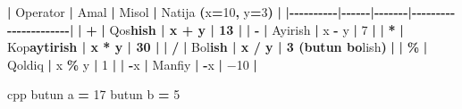 \documentclass[a4paper,11pt,twoside,openright]{book}
\newenvironment{Shaded}{\begin{snugshade}}{\end{snugshade}}
\newcommand{\CharTok}[1]{\textcolor[rgb]{0.31,0.60,0.02}{#1}}
\newcommand{\DecValTok}[1]{\textcolor[rgb]{0.00,0.00,0.81}{#1}}
\newcommand{\ErrorTok}[1]{\textcolor[rgb]{0.64,0.00,0.00}{\textbf{#1}}}
\newcommand{\NormalTok}[1]{#1}
\newcommand{\OperatorTok}[1]{\textcolor[rgb]{0.81,0.36,0.00}{\textbf{#1}}}
\begin{document}
\begin{Shaded}
\begin{Highlighting}[]
\OperatorTok{|}\NormalTok{ Operator }\OperatorTok{|}\NormalTok{ Amal }\OperatorTok{|}\NormalTok{ Misol }\OperatorTok{|}\NormalTok{ Natija }\OperatorTok{(}\ErrorTok{\textasciigrave{}}\NormalTok{x}\OperatorTok{=}\DecValTok{10}\OperatorTok{,}\NormalTok{ y}\OperatorTok{=}\DecValTok{3}\ErrorTok{\textasciigrave{}}\OperatorTok{)} \OperatorTok{|}
\OperatorTok{|{-}{-}{-}{-}{-}{-}{-}{-}{-}{-}|{-}{-}{-}{-}{-}{-}|{-}{-}{-}{-}{-}{-}{-}|{-}{-}{-}{-}{-}{-}{-}{-}{-}{-}{-}{-}{-}{-}{-}{-}{-}{-}{-}{-}{-}{-}|}
\OperatorTok{|} \ErrorTok{\textasciigrave{}}\OperatorTok{+}\ErrorTok{\textasciigrave{}} \OperatorTok{|}\NormalTok{ Qo}\CharTok{\textquotesingle{}s}\ErrorTok{hish | \textasciigrave{}x + y\textasciigrave{} | 13 |}
\OperatorTok{|} \ErrorTok{\textasciigrave{}}\OperatorTok{{-}}\ErrorTok{\textasciigrave{}} \OperatorTok{|}\NormalTok{ Ayirish }\OperatorTok{|} \ErrorTok{\textasciigrave{}}\NormalTok{x }\OperatorTok{{-}}\NormalTok{ y}\ErrorTok{\textasciigrave{}} \OperatorTok{|} \DecValTok{7} \OperatorTok{|}
\OperatorTok{|} \ErrorTok{\textasciigrave{}}\OperatorTok{*}\ErrorTok{\textasciigrave{}} \OperatorTok{|}\NormalTok{ Ko}\CharTok{\textquotesingle{}p}\ErrorTok{aytirish | \textasciigrave{}x * y\textasciigrave{} | 30 |}
\OperatorTok{|} \ErrorTok{\textasciigrave{}}\OperatorTok{/}\ErrorTok{\textasciigrave{}} \OperatorTok{|}\NormalTok{ Bo}\CharTok{\textquotesingle{}l}\ErrorTok{ish | \textasciigrave{}x / y\textasciigrave{} | 3 (butun bo}\CharTok{\textquotesingle{}}\NormalTok{lish}\OperatorTok{)} \OperatorTok{|}
\OperatorTok{|} \ErrorTok{\textasciigrave{}}\OperatorTok{\%}\ErrorTok{\textasciigrave{}} \OperatorTok{|}\NormalTok{ Qoldiq }\OperatorTok{|} \ErrorTok{\textasciigrave{}}\NormalTok{x }\OperatorTok{\%}\NormalTok{ y}\ErrorTok{\textasciigrave{}} \OperatorTok{|} \DecValTok{1} \OperatorTok{|}
\OperatorTok{|} \ErrorTok{\textasciigrave{}}\OperatorTok{{-}}\NormalTok{x}\ErrorTok{\textasciigrave{}} \OperatorTok{|}\NormalTok{ Manfiy }\OperatorTok{|} \ErrorTok{\textasciigrave{}}\OperatorTok{{-}}\NormalTok{x}\ErrorTok{\textasciigrave{}} \OperatorTok{|}\NormalTok{ −}\DecValTok{10} \OperatorTok{|}

\ErrorTok{\textasciigrave{}\textasciigrave{}\textasciigrave{}}\NormalTok{cpp}
\NormalTok{butun a }\OperatorTok{=} \DecValTok{17}
\NormalTok{butun b }\OperatorTok{=} \DecValTok{5}


\end{Highlighting}
\end{Shaded}
\end{document}
